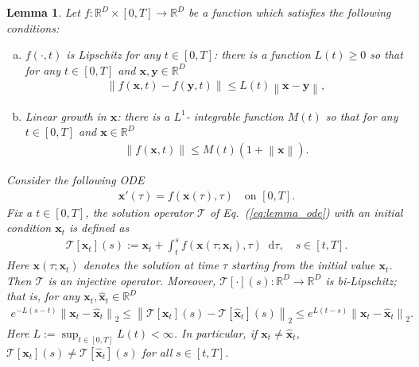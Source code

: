 \documentclass{article} \usepackage{iclr2024_coNFErence,times}
\def\eqref#1{equation~\ref{#1}}
\newcommand{\norm}[1]{\left\lVert#1\right\rVert}
\def\eqref#1{(\ref{#1})}
\def\eqref#1{(\ref{#1})}
\newtheorem{lemma}[theorem]{Lemma}
\theoremstyle{definition}
\theoremstyle{remark}
\newcommand*\diff{\mathop{}\!\mathrm{d}}
\begin{document}
\begin{lemma}\label{th:injective_sol_op}
    Let $f\colon\mathbb{R}^D\times[0,T]\rightarrow\mathbb{R}^D$ be a function which satisfies the following conditions:
    \begin{enumerate}[(a)]
        \item $f(\cdot, t)$ is Lipschitz for any $t\in[0,T]$: there is a function $L(t)\geq0$ so that for any $t\in[0,T]$ and $\mathbf{x},\mathbf{y}\in\mathbb{R}^D$
        \begin{align*}
            \norm{f(\mathbf{x}, t)-f(\mathbf{y}, t)}\leq L(t)\norm{\mathbf{x}-\mathbf{y}}, 
        \end{align*}
        \item Linear growth in $\mathbf{x}$: there is a $L^1$- integrable function $M(t)$ so that for any $t\in[0,T]$ and $\mathbf{x}\in\mathbb{R}^D$
        \begin{align*}
            \norm{f(\mathbf{x}, t)}\leq M(t)(1+\norm{\mathbf{x}}).
        \end{align*}        
    \end{enumerate}
    Consider the following ODE 
    \begin{align}\label{eq:lemma_ode}
        \mathbf{x}'(\tau)=f(\mathbf{x}(\tau), \tau)\quad\text{on }[0,T].
    \end{align}
   Fix a $t\in[0,T]$, the solution operator $\mathcal{T}$ of Eq.~\eqref{eq:lemma_ode} with an initial condition $\mathbf{x}_t$ is defined as
   \begin{align}\label{eq:sol_op}
       \mathcal{T}[\mathbf{x}_t](s):=\mathbf{x}_t+\int_{t}^{s}f(\mathbf{x}(\tau;\mathbf{x}_t), \tau)\diff\tau, \quad s\in[t,T].
   \end{align}
   Here $\mathbf{x}(\tau;\mathbf{x}_t)$ denotes the solution at time $\tau$ starting from the initial value $\mathbf{x}_t$.
   Then $\mathcal{T}$ is an injective operator. Moreover, $\mathcal{T}[\cdot](s)\colon\mathbb{R}^D\rightarrow\mathbb{R}^D$ is bi-Lipschitz; that is, for any $\mathbf{x}_t, \hat{\mathbf{x}}_t\in\mathbb{R}^D$
   \begin{align}
       e^{-L(s-t)}\norm{\mathbf{x}_t- \hat{\mathbf{x}}_t}_2\leq \norm{\mathcal{T}[\mathbf{x}_t](s) -\mathcal{T}[\hat{\mathbf{x}}_t](s)}_2 \leq e^{L(t-s)}\norm{\mathbf{x}_t- \hat{\mathbf{x}}_t}_2.
   \end{align}
   Here $L:=\sup_{t\in[0,T]} L(t)<\infty$.
   In particular, if $\mathbf{x}_t\neq\hat{\mathbf{x}}_t$, $\mathcal{T}[\mathbf{x}_t](s)\neq\mathcal{T}[\hat{\mathbf{x}}_t](s)$ for all $s\in[t, T]$.
\end{lemma}
\end{document}
